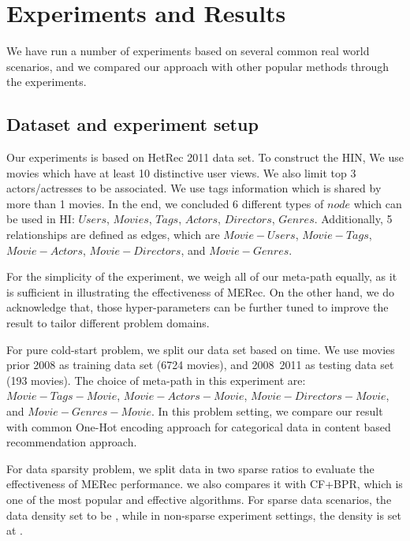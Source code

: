 \section{Experiments and Results}\label{4_experiment}
We have run a number of experiments based on several common real world scenarios, and we compared our approach with other popular methods through the experiments.
\subsection{Dataset and experiment setup}
Our experiments is based on HetRec 2011 \cite{CantadorRecSys2011} data set. To construct the HIN, We use movies which have at least 10 distinctive user views. We also limit top 3 actors/actresses to be associated. We use tags information which is shared by more than 1 movies. In the end, we concluded 6 different types of $node$ which can be used in HI: $Users$, $Movies$, $Tags$, $Actors$, $Directors$, $Genres$.
Additionally, 5 relationships are defined as edges, which are $Movie-Users$, $Movie-Tags$, $Movie-Actors$, $Movie-Directors$, and $Movie-Genres$.

For the simplicity of the experiment, we weigh all of our meta-path equally, as it is sufficient in illustrating the effectiveness of MERec. On the other hand, we do acknowledge that, those hyper-parameters can be further tuned to improve the result to tailor different problem domains. 

For pure cold-start problem, we split our data set based on time. We use movies prior 2008 as training data set (6724 movies), and 2008~2011 as testing data set (193 movies). The choice of meta-path in this experiment are: $Movie-Tags-Movie$, $Movie-Actors-Movie$, $Movie-Directors-Movie$, and $Movie-Genres-Movie$. In this problem setting, we compare our result with common One-Hot encoding approach for categorical data in content based recommendation approach.

For data sparsity problem, we split data in two sparse ratios to evaluate the effectiveness of MERec performance. we also compares it with CF+BPR, which is one of the most popular and effective algorithms. For sparse data scenarios, the data density set to be , while in non-sparse experiment settings, the density is set at .


